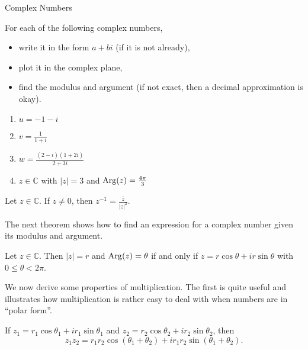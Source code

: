 \begin{section}{Complex Numbers}
\begin{example}
\begin{center}
\end{center}
\end{example}

\begin{problem}\label{prob.ComplexCheckin}
For each of the following complex numbers,
\begin{itemize}
\item write it in the form $a+bi$ (if it is not already),
\item plot it in the complex plane,
\item find the modulus and argument (if not exact, then a decimal approximation is okay).
\end{itemize}
\begin{multicols}{2}
\begin{enumerate}
\item $u = -1-i$
\item $v= \frac{1}{1+i}$
\item $w = \frac{(2-i)(1+2i)}{2+3i}$
\item $z\in \mathbb{C}$ with $|z| = 3$ and $\operatorname{Arg}(z) = \frac{4\pi}{3}$
\end{enumerate}
\end{multicols}
\end{problem}

\begin{theorem}
Let $z\in \mathbb{C}$. If $z\neq 0$, then $z^{-1} = \displaystyle\frac{\overline{z}}{|z|^2}$.
\end{theorem}

The next theorem shows how to find an expression for a complex number given its modulus and argument.
 
\begin{theorem}\label{thm.PolarToRectangular}
Let $z\in \mathbb{C}$. Then $|z| = r$ and $\operatorname{Arg}(z) = \theta$ if and only if $z = r\cos\theta + ir\sin\theta$ with $0\le \theta <2\pi$.
\end{theorem}

We now derive some properties of multiplication. The first is quite useful and illustrates how multiplication is rather easy to deal with when numbers are in ``polar form''.

\begin{theorem}\label{thm.MultiplyComplex}
If $z_1 = r_1\cos\theta_1 + ir_1\sin\theta_1$ and $z_2=r_2\cos\theta_2 + ir_2\sin\theta_2$, then \[z_1z_2 = r_1r_2\cos(\theta_1+\theta_2) + ir_1r_2\sin(\theta_1+\theta_2).\]
\end{theorem}


\end{section}
